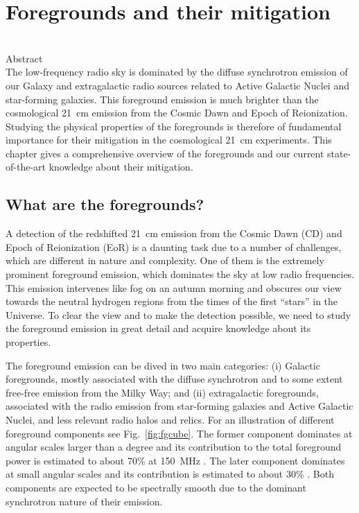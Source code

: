 \chapter{Foregrounds and their mitigation}
\begin{bf}
	\author{Emma Chapman (Imperial College London) \\and Vibor Jeli\'c (Ru{\dj}er Bo\v{s}kovi\'c Institute)}\\

	Abstract\\
The low-frequency radio sky is dominated by the diffuse synchrotron emission of our Galaxy and extragalactic radio sources related to Active Galactic Nuclei and star-forming galaxies. This foreground emission  is much brighter than the cosmological 21~cm emission from the Cosmic Dawn and Epoch of Reionization. Studying the physical properties of the foregrounds is therefore of fundamental importance for their mitigation in the cosmological 21~cm experiments. This chapter gives a comprehensive overview of the foregrounds and our current state-of-the-art knowledge about their mitigation.
\end{bf}

\section{What are the foregrounds?}
A detection of the redshifted 21~cm emission from the Cosmic Dawn (CD) and Epoch of Reionization (EoR) is a daunting task due to a number of challenges, which are different in nature and complexity. One of them is the extremely prominent foreground emission, which dominates the sky at low radio frequencies.  This emission intervenes like fog on an autumn morning and obscures our view towards the neutral hydrogen regions from the times of the first ``stars'' in the Universe. To clear the view and to make the detection possible, we need to study the foreground emission in great detail and acquire knowledge about its properties.

The foreground emission can be dived in two main categories: (i) Galactic foregrounds, mostly associated with the diffuse synchrotron and to some extent free-free emission from the Milky Way; and (ii) extragalactic foregrounds, associated with the radio emission from star-forming galaxies and Active Galactic Nuclei, and less relevant radio halos and relics. For an illustration of different foreground components see Fig.~\ref{fig:fgcube}. The former component dominates at angular scales larger than a degree and its contribution to the total foreground power is estimated to about 70\% at 150~MHz \cite{shaver99}. The later component dominates at small angular scales and its contribution is estimated to about 30\% \cite{shaver99}.  Both components are expected to be spectrally smooth due to the dominant synchrotron nature of their emission. 

